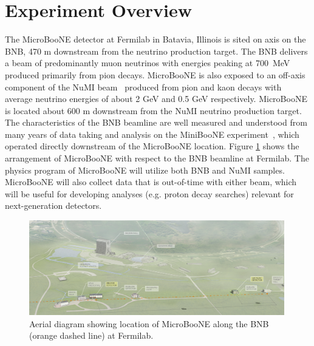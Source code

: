 \section{Experiment Overview}
\label{sec:overview}

The MicroBooNE detector at Fermilab in Batavia, Illinois is sited on axis on the BNB, 470 m downstream from the neutrino production target.   The BNB delivers a beam of predominantly muon neutrinos with energies peaking at 700~MeV produced primarily from pion decays. MicroBooNE is also exposed to an off-axis component of the NuMI beam~\cite{Adamson:2015dkw} produced from pion and kaon decays with average neutrino energies of about 2 GeV and 0.5 GeV respectively.   MicroBooNE is located about 600 m downstream from the NuMI neutrino production target.  The characteristics of the BNB beamline are well measured and understood from many years of data taking and analysis on the MiniBooNE experiment~\cite{AguilarArevalo:2008-MBflux}, which operated directly downstream of the MicroBooNE location.  Figure \ref{fnalmap} shows the arrangement of MicroBooNE with respect to the BNB beamline at Fermilab.  The physics program of MicroBooNE will utilize both BNB and NuMI samples.  MicroBooNE will also collect data that is out-of-time with either beam, which will be useful for developing analyses (e.g. proton decay searches) relevant for next-generation detectors.  


\begin{figure}
\centering 
\includegraphics[width=0.99\textwidth]{figures/aerial_diagram.jpg}
\caption{Aerial diagram showing location of MicroBooNE along the BNB (orange dashed line) at Fermilab.}
\label{fnalmap}
\end{figure}


